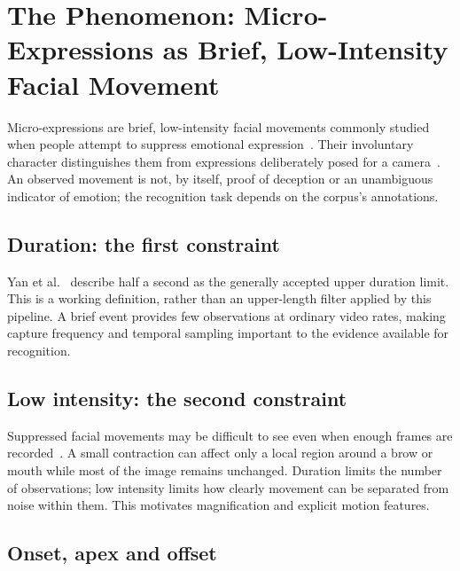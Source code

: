 
\section{The Phenomenon: Micro-Expressions as Brief, Low-Intensity Facial Movement}
\label{sec:phenomenon}

Micro-expressions are brief, low-intensity facial movements commonly studied when people attempt to suppress emotional expression~\cite{yan2014}. Their involuntary character distinguishes them from expressions deliberately posed for a camera~\cite{qu2016}. An observed movement is not, by itself, proof of deception or an unambiguous indicator of emotion; the recognition task depends on the corpus's annotations.

\subsection{Duration: the first constraint}
\label{sec:duration}

Yan et al.~\cite{yan2014} describe half a second as the generally accepted upper duration limit. This is a working definition, rather than an upper-length filter applied by this pipeline. A brief event provides few observations at ordinary video rates, making capture frequency and temporal sampling important to the evidence available for recognition.

\subsection{Low intensity: the second constraint}
\label{sec:low-intensity}

Suppressed facial movements may be difficult to see even when enough frames are recorded~\cite{yan2014}. A small contraction can affect only a local region around a brow or mouth while most of the image remains unchanged. Duration limits the number of observations; low intensity limits how clearly movement can be separated from noise within them. This motivates magnification and explicit motion features.

\subsection{Onset, apex and offset}
\label{sec:onset-apex-offset}


